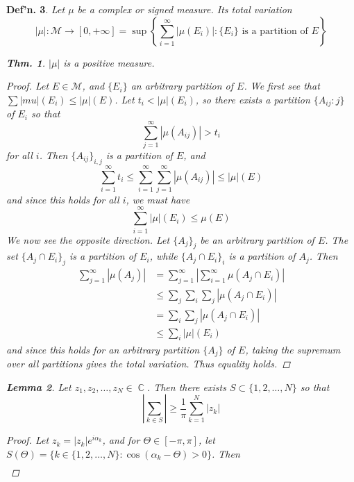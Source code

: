 \documentclass[12pt, a4paper]{book}
\DeclareMathOperator{\C}{\mathbb{C}}
\newtheorem{theorem}{Thm.}[section]
\newtheorem{lemma}[theorem]{Lemma}
\newtheorem{definition}[theorem]{Def'n.}
\theoremstyle{nonumberplain}
\newtheorem{proof}{Proof}
\begin{document}
\begin{definition}
    Let $\mu$ be a complex or signed measure.
    Its total variation
    \[|\mu|:\mathcal{M}\to[0,+\infty]=\sup\left\{\sum\limits_{i=1}^\infty |\mu(E_i)|:\{E_i\}\text{ is a partition of $E$}\right\}\]
\begin{theorem}
    $|\mu|$ is a positive measure.
\end{theorem}
\begin{proof}
    Let $E\in\mathcal{M}$, and $\{E_i\}$ an arbitrary partition of $E$.
    We first see that $\sum|mu|(E_i)\leq|\mu|(E)$.
    Let $t_i<|\mu|(E_i)$, so there exists a partition $\{A_{ij}:j\}$ of $E_i$ so that
    \[\sum\limits_{j=1}^\infty|\mu(A_{ij})|>t_i\]
    for all $i$.
    Then $\{A_{ij}\}_{i,j}$ is a partition of $E$, and
    \[\sum\limits_{i=1}^\infty t_i\leq\sum\limits_{i=1}^\infty\sum\limits_{j=1}^\infty|\mu(A_{ij})|\leq|\mu|(E)\]
    and since this holds for all $i$, we must have
    \[\sum\limits_{i=1}^\infty|\mu|(E_i)\leq\mu(E)\]
    We now see the opposite direction.
    Let $\{A_j\}_j$ be an arbitrary partition of $E$.
    The set $\{A_j\cap E_i\}_j$ is a partition of $E_i$, while $\{A_j\cap E_i\}_i$ is a partition of $A_j$.
    Then
    \begin{align*}
        \sum\limits_{j=1}^\infty|\mu(A_j)| &= \sum\limits_{j=1}^\infty\left\lvert\sum\limits_{i=1}^\infty \mu(A_j\cap E_i)\right\rvert\\
                                           &\leq\sum\limits_j\sum\limits_i\sum\limits_j|\mu(A_j\cap E_i)|\\
                                           &=\sum\limits_i\sum\limits_j|\mu(A_j\cap E_i)|\\
                                           &\leq \sum\limits_i|\mu|(E_i)
    \end{align*}
    and since this holds for an arbitrary partition $\{A_j\}$ of $E$, taking the supremum over all partitions gives the total variation.
    Thus equality holds.
\end{proof}
\begin{lemma}
    Let $z_1,z_2,\ldots,z_N\in\C$.
    Then there exists $S\subset\{1,2,\ldots,N\}$ so that
    \[\left\lvert\sum\limits_{k\in S}\right\rvert\geq\frac{1}{\pi}\sum\limits_{k=1}^N|z_k|\]
\end{lemma}
\begin{proof}
    Let $z_k=|z_k|e^{i\alpha_k}$, and for $\Theta\in[-\pi,\pi]$, let $S(\Theta)=\{k\in\{1,2,\ldots,N\}:\cos(\alpha_k-\Theta)>0\}$.
    Then
    \begin{align*}

\end{align*}
\end{proof}
\end{definition}
\end{document}
